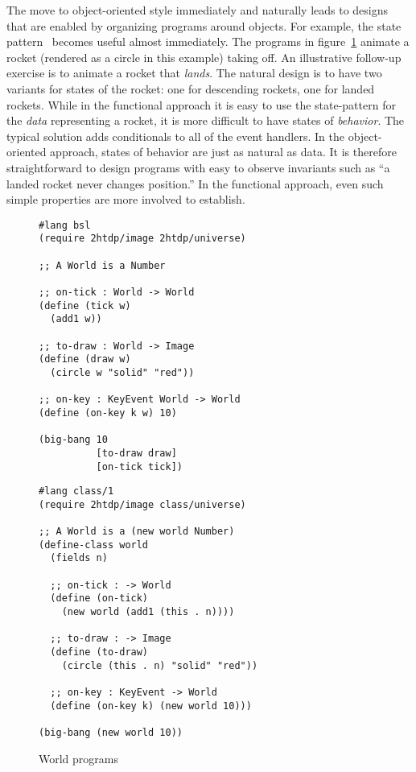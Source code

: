 \documentclass[submission,copyright]{eptcs}
\begin{document}
The move to object-oriented style immediately and naturally leads to
designs that are enabled by organizing programs around objects.  For
example, the state pattern~\cite{samth:GOF} becomes useful almost
immediately.  The programs in figure~\ref{fig:world} animate a rocket
(rendered as a circle in this example) taking off.  An illustrative
follow-up exercise is to animate a rocket that \emph{lands}.  The
natural design is to have two variants for states of the rocket: one
for descending rockets, one for landed rockets.  While in the
functional approach it is easy to use the state-pattern for the
\emph{data} representing a rocket, it is more difficult to have states
of \emph{behavior}.  The typical solution adds conditionals to all of
the event handlers.  In the object-oriented approach, states of
behavior are just as natural as data.  It is therefore straightforward
to design programs with easy to observe invariants such as ``a landed
rocket never changes position.''  In the functional approach, even
such simple properties are more involved to establish.

\begin{figure}
\begin{minipage}[t]{3.4in}
\begin{verbatim}
#lang bsl
(require 2htdp/image 2htdp/universe)

;; A World is a Number

;; on-tick : World -> World
(define (tick w)
  (add1 w))

;; to-draw : World -> Image
(define (draw w)
  (circle w "solid" "red"))

;; on-key : KeyEvent World -> World
(define (on-key k w) 10)

(big-bang 10
          [to-draw draw]
          [on-tick tick])
\end{verbatim}
\end{minipage}
\begin{minipage}[t]{3in}
\begin{verbatim}
#lang class/1
(require 2htdp/image class/universe)

;; A World is a (new world Number)
(define-class world
  (fields n)

  ;; on-tick : -> World
  (define (on-tick)
    (new world (add1 (this . n))))

  ;; to-draw : -> Image
  (define (to-draw) 
    (circle (this . n) "solid" "red"))

  ;; on-key : KeyEvent -> World
  (define (on-key k) (new world 10)))
  
(big-bang (new world 10))
\end{verbatim}
\end{minipage}
\caption{World programs}
\label{fig:world}
\end{figure}
\end{document}
